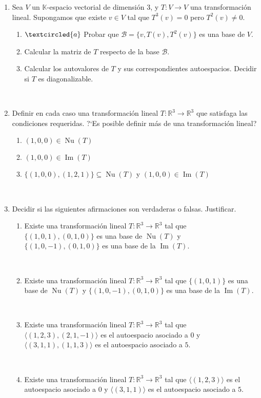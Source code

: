 \documentclass[12pt]{amsart}
\begin{document}
\begin{enumerate}
\

\item \label{base nilp} Sea $V$ un $\mathbb{K}$-espacio vectorial de dimensi\'on $3$, y $T:V\longrightarrow V$ una transformaci\'on lineal. Supongamos que existe $v\in V$ tal que $T^3(v)=0$ pero $T^{2}(v)\neq 0$.
\begin{enumerate}
 \item\label{base nilp a} $\textcircled{a}$ Probar que $\mathcal{B}=\{v,T(v),T^2(v)\}$ es una base de $V$.
 \item Calcular la matriz de $T$ respecto de la base $\mathcal{B}$.
 \item Calcular los autovalores de $T$ y sus correspondientes autoespacios. Decidir si $T$ es diagonalizable.
\end{enumerate}

\

\item Definir en cada caso una transformaci\'on lineal $T:\mathbb{R}^3\longrightarrow\mathbb{R}^3$ que satisfaga las condiciones requeridas. ?`Es posible definir m\'as de una transformaci\'on lineal?
\begin{enumerate}
 \item $(1,0,0)\in \operatorname{Nu}(T)$
 \item $(1,0,0)\in \operatorname{Im}(T)$
 \item $\{(1,0,0),(1,2,1)\}\subseteq\operatorname{Nu}(T)$ y $(1,0,0) \in  \operatorname{Im}(T)$
\end{enumerate}

\

\item Decidir si las siguientes afirmaciones son verdaderas o falsas. Justificar.

\begin{enumerate}
\item Existe una transformaci\'on lineal $T:\mathbb{R}^3\longrightarrow\mathbb{R}^3$ tal que $\{(1,0,1), (0,1,0)\}$ es una base de $\operatorname{Nu}(T)$ y  $\{(1,0,-1), (0,1,0)\}$ es una base de la $\operatorname{Im}(T)$.

 \

 \item Existe una transformaci\'on lineal $T:\mathbb{R}^3\longrightarrow\mathbb{R}^3$ tal que $\{(1,0,1)\}$ es una base de $\operatorname{Nu}(T)$ y  $\{(1,0,-1), (0,1,0)\}$ es una base de la $\operatorname{Im}(T)$.

\

\item Existe una transformaci\'on lineal $T:\mathbb{R}^3\longrightarrow\mathbb{R}^3$ tal que $\langle(1,2,3),(2,1,-1)\rangle$ es el autoespacio asociado a $0$ y $\langle(3,1,1),(1,1,3)\rangle$ es el autoespacio asociado a $5$.

\

\item Existe una transformaci\'on lineal $T:\mathbb{R}^3\longrightarrow\mathbb{R}^3$ tal que $\langle(1,2,3)\rangle$ es el autoespacio asociado a $0$ y $\langle(3,1,1)\rangle$ es el autoespacio asociado a $5$.
\end{enumerate}


\end{enumerate}
\end{document}
